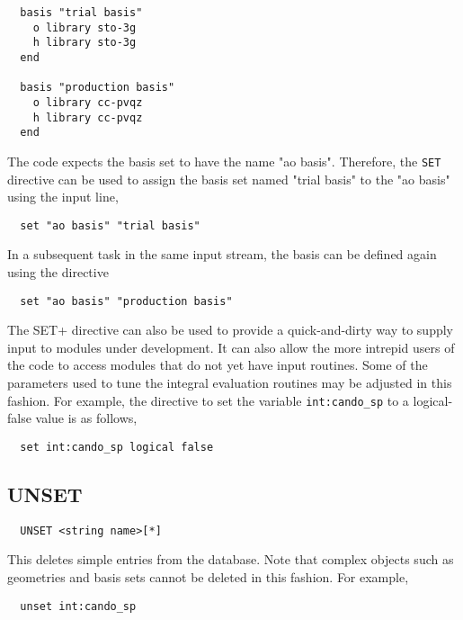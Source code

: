 \begin{verbatim}
  basis "trial basis"
    o library sto-3g
    h library sto-3g
  end

  basis "production basis"
    o library cc-pvqz
    h library cc-pvqz
  end
\end{verbatim}

The code expects the basis set to have the name "ao basis".  Therefore,
the \verb+SET+ directive can be used to assign the basis set named
"trial basis" to the "ao basis" using the input line,

\begin{verbatim}
  set "ao basis" "trial basis"
\end{verbatim}

In a subsequent task in the same input stream, the basis can be defined
again using the directive
\begin{verbatim}
  set "ao basis" "production basis"
\end{verbatim}

The \+SET+ directive can also be used to provide a quick-and-dirty way 
to supply input to modules under development.  It can also allow the more 
intrepid users of the code to access modules that do not yet have
input routines.  Some of the parameters used to tune the
integral evaluation routines may be adjusted in this fashion.  For
example, the directive to set the variable \verb+int:cando_sp+ to a 
logical-false value is as follows,
 
\begin{verbatim}
  set int:cando_sp logical false
\end{verbatim}

\subsection{UNSET}
\label{sec:unset}

\begin{verbatim}
  UNSET <string name>[*]
\end{verbatim}

This deletes simple entries from the database.  Note that complex
objects such as geometries and basis sets cannot be deleted in this
fashion.  For example, 
\begin{verbatim}
  unset int:cando_sp
\end{verbatim}


